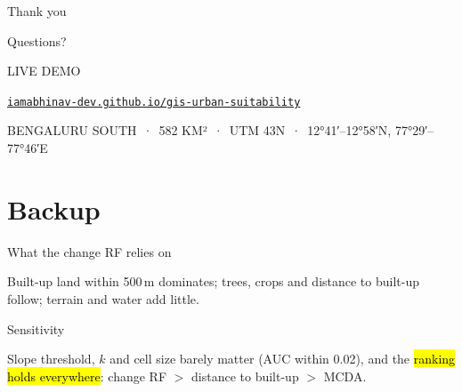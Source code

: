 \documentclass[aspectratio=169,11pt,t]{beamer}
\newcommand{\siteurl}{https://iamabhinav-dev.github.io/gis-urban-suitability/}
\begin{document}
{
\begin{frame}
  \centering
  {\display\fontsize{40}{42}\selectfont\color{sheet}Thank you\par}
  \vspace{4pt}
  {\displaymed\fontsize{16}{18}\selectfont\color{sthree}Questions?\par}
  \vspace{18pt}
  {\ttfamily\fontsize{5.6}{7}\selectfont\color{white!60!ink}LIVE DEMO\par}\vspace{3pt}
  {\small\color{sheet}\href{\siteurl}{\texttt{\color{sheet}iamabhinav-dev.github.io/gis-urban-suitability}}\par}
  \vspace{14pt}
  {\ttfamily\fontsize{5.6}{7}\selectfont\color{white!60!ink}BENGALURU SOUTH \,·\, 582 KM² \,·\,
    UTM 43N \,·\, 12°41′--12°58′N, 77°29′--77°46′E}
\end{frame}
}

\appendix
\sheetbackuptrue
\section{Backup}

\begin{frame}{What the change RF relies on}
  \centering
  \par\vspace{5pt}
  \small Built-up land within 500\,m dominates; trees, crops and distance to built-up follow;
  terrain and water add little.
\end{frame}

\begin{frame}{Sensitivity}
  \centering
  \par\vspace{6pt}
  \small Slope threshold, $k$ and cell size barely matter (AUC within 0.02), and the
  \hl{ranking holds everywhere}: change RF $>$ distance to built-up $>$ MCDA.
\end{frame}
\end{document}

